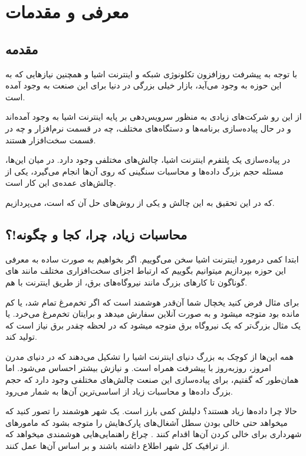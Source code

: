 \chapter{معرفی و مقدمات  }

\section{مقدمه}
با توجه به پیشرفت روزافزون تکلونوژی شبکه و اینترنت اشیا و همچنین نیازهایی که به این حوزه به وجود می‌آید، بازار خیلی بزرگی در دنیا برای این صنعت به وجود آمده است.

از این رو شرکت‌های زیادی به منظور سرویس‌دهی بر پایه اینترنت اشیا به وجود آمده‌اند و در حال پیاده‌سازی برنامه‌ها و دستگاه‌های مختلف، چه در قسمت نرم‌افزار و چه در قسمت سخت‌افزار هستند.

در پیاده‌سازی یک پلتفرم اینترنت اشیا، چالش‌های مختلفی وجود دارد.
در میان این‌ها، مسئله حجم بزرگ داده‌ها و محاسبات سنگینی که روی آن‌ها انجام می‌گیرد، یکی از چالش‌های عمده‌ی این کار است.

که در این تحقیق به این چالش و یکی از روش‌های حل آن که  است، می‌پردازیم.


\section{محاسبات زیاد، چرا، کجا و چگونه!؟}\label{sec2}
ابتدا کمی درمورد اینترنت اشیا سخن می‌گوییم. اگر بخواهیم به صورت ساده به معرفی این حوزه بپردازیم میتوانیم بگوییم که ارتباط اجزای سخت‌افزاری مختلف مانند  های گوناگون تا کارهای بزرگ مانند نیروگاه‌های برق، از طریق اینترنت با هم.

برای مثال فرض کنید یخچال شما آن‌قدر هوشمند است که اگر تخم‌مرغ تمام شد، یا کم مانده بود متوجه میشود و به صورت آنلاین سفارش میدهد و برایتان تخم‌مرغ می‌خرد.
یا یک مثال بزرگ‌تر که یک نیروگاه برق متوجه میشود که در لحظه چقدر برق نیاز است که تولید کند.

همه این‌ها از کوچک به بزرگ دنیای اینترنت اشیا را تشکیل می‌دهند که در دنیای مدرن امروز،‌ روزبه‌روز با پیشرفت همراه است. و نیازش بیشتر احساس می‌شود.
اما همان‌طور که گفتیم، برای پیاده‌سازی این صنعت چالش‌های مختلفی وجود دارد که حجم بزرگ داده‌ها و محاسبات زیاد از اساسی‌ترین آن‌ها به شمار می‌رود.

حالا چرا داده‌ها زیاد هستند؟ دلیلش کمی بارز است. یک شهر هوشمند را تصور کنید که میخواهد حتی خالی بودن سطل آشغال‌های پارک‌هایش را متوجه بشود که مامورهای شهرداری برای خالی کردن آن‌ها اقدام کنند . چراغ راهنمایی‌هایی هوشمندی میخواهد که از ترافیک کل شهر اطلاع داشته باشند و بر اساس آن‌ها عمل کنند.

